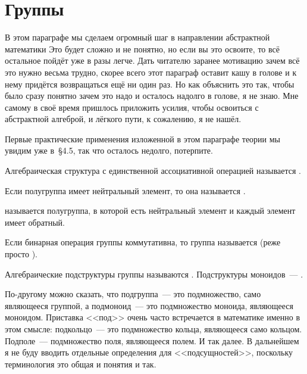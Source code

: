 \section{Группы}

В этом параграфе мы сделаем огромный шаг в направлении абстрактной математики Это будет сложно и не понятно, но если вы это освоите, то всё остальное пойдёт уже в разы легче. Дать читателю заранее мотивацию зачем всё это нужно весьма трудно, скорее всего этот параграф оставит кашу в голове и к нему придётся возвращаться ещё ни один раз. Но как объяснить это так, чтобы было сразу понятно зачем это надо и осталось надолго в голове, я не знаю. Мне самому в своё время пришлось приложить усилия, чтобы освоиться с абстрактной алгеброй, и лёгкого пути, к сожалению, я не нашёл.

Первые практические применения изложенной в этом параграфе теории мы увидим уже в~\S4.5, так что осталось недолго, потерпите.

\begin{definition}
	Алгебраическая структура с единственной ассоциативной операцией называется .
\end{definition}

\begin{definition}
	Если полугруппа имеет нейтральный элемент, то она называется .
\end{definition}

\begin{definition}
	 называется полугруппа, в которой есть нейтральный элемент и каждый элемент имеет обратный.
\end{definition}

\begin{definition}
	Если бинарная операция группы коммутативна, то группа называется  (реже просто ).
\end{definition}

\begin{definition}
	Алгебраические подструктуры группы называются . Подструктуры моноидов~--- .
\end{definition}

По-другому можно сказать, что подгруппа~--- это подмножество, само являющееся группой, а подмоноид~--- это подмножество моноида, являющееся моноидом. Приставка <<под>> очень часто встречается в математике именно в этом смысле: подкольцо~--- это подмножество кольца, являющееся само кольцом. Подполе~--- подмножество поля, являющееся полем. И так далее. В дальнейшем я не буду вводить отдельные определения для <<подсущностей>>, поскольку терминология это общая и понятия и так.

